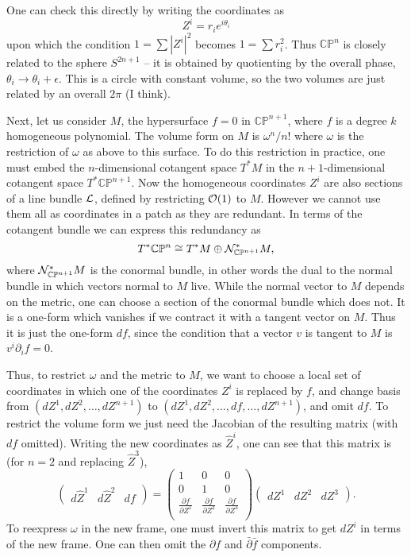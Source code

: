 \documentclass[12pt]{article}
\def\IC{\mathbb{C}}
\def\IP{\mathbb{P}}
\def\CN {{\cal N}}
\def\CL {{\cal L}}
\def\CO {{\cal O}}
\newcommand{\be}{\begin{equation}}
\newcommand{\ee}{\end{equation}}
\def\bpartial{\bar{\partial}}
\begin{document}
One can check this directly by writing the coordinates as
\be
Z^i = r_i e^{i\theta_i}
\ee
upon which the condition $1=\sum |Z^i|^2$ becomes $1=\sum r_i^2$.  Thus $\IC\IP^n$ is closely
related to the sphere $S^{2n+1}$ -- it is obtained by quotienting by the overall phase, 
$\theta_i\rightarrow\theta_i+\epsilon$.  This is a circle with constant volume, so the two volumes
are just related by an overall $2\pi$ (I think).

Next, let us consider $M$, the hypersurface $f=0$ in $\IC\IP^{n+1}$, where $f$ is a degree $k$ homogeneous
polynomial.  The volume form on $M$ is $\omega^n/n!$ where $\omega$ is the restriction of
$\omega$ as above to this surface.  To do this restriction in practice, one must embed the $n$-dimensional
cotangent space $T^*M$ in the $n+1$-dimensional cotangent space  $T^*\IC\IP^{n+1}$.  Now the homogeneous
coordinates $Z^i$ are also sections of a line bundle $\CL$, defined by restricting $\CO(1)$ to $M$.
However we cannot use them all as coordinates in a patch as they are redundant.  In terms of the
cotangent bundle we can express this redundancy as
\be
T^*\IC\IP^n \cong T^*M \oplus \CN^*_{\IC\IP^{n+1}} M ,
\ee
where $\CN^*_{\IC\IP^{n+1}} M$ is the conormal bundle, in other words the dual to the normal bundle in 
which vectors normal to $M$ live.  While the normal vector to $M$ depends on the metric, one can choose a section of
the conormal bundle which does not.  It is a one-form which vanishes if we contract it with a tangent vector on $M$.
Thus it is just the one-form $df$, since the condition that a vector $v$ is tangent to $M$ is $v^i\partial_i f=0$.

Thus, to restrict $\omega$ and the metric to $M$, we want to choose a local set of coordinates in which one of
the coordinates $Z^i$ is replaced by $f$, and change basis from $(dZ^1,dZ^2,\ldots,dZ^{n+1})$ to 
$(dZ^1,dZ^2,\ldots,df,\ldots,dZ^{n+1})$, and omit $df$.  To restrict the volume form we just need the Jacobian
of the resulting matrix (with $df$ omitted).  Writing the new coordinates as $\hat Z^i$,
one can see that this matrix is (for $n=2$ and replacing $\hat Z^3$),
\be
\left(\begin{matrix} d\hat Z^1 & d\hat Z^2 & df \end{matrix} \right) = 
\left(\begin{matrix} 1 & 0 & 0 \\
0 & 1 & 0 \\
\frac{\partial f}{\partial Z^1} & \frac{\partial f}{\partial Z^2} & \frac{\partial f}{\partial Z^3} \\
\end{matrix} \right)
\left(\begin{matrix} dZ^1 & dZ^2 & dZ^3 \end{matrix} \right).
\ee
To reexpress $\omega$ in the new frame, one must invert this matrix to get $dZ^i$ in terms of the 
new frame.  One can then omit the $\partial f$ and $\bpartial \bar f$ components.
\end{document}

